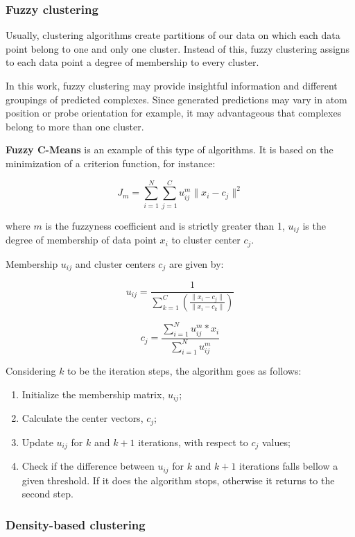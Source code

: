 \subsubsection{Fuzzy clustering}
Usually, clustering algorithms create partitions of our data on which each data point belong to one and only one cluster. Instead of this, fuzzy clustering \cite{jain1999data} assigns to each data point a degree of membership to every cluster.

In this work, fuzzy clustering may provide insightful information and different groupings of predicted complexes. Since generated predictions may vary in atom position or probe orientation for example, it may advantageous that complexes belong to more than one cluster.

\textbf{Fuzzy C-Means} is an example of this type of algorithms. It is based on the minimization of a criterion function, for instance:

$$J_m = \sum_{i=1}^{N}\sum_{j=1}^{C} u_{ij}^m \parallel x_i - c_j \parallel^2 $$

where $m$ is the fuzzyness coefficient and is strictly greater than 1, $u_{ij}$ is the degree of membership of data point $x_i$ to cluster center $c_j$.

Membership $u_{ij}$ and cluster centers $c_j$ are given by:

$$u_{ij} = \frac{1}{\sum_{k=1}^{C} \left( \frac{\parallel x_i - c_j \parallel}{\parallel x_i - c_k \parallel} \right) }$$


$$c_j = \frac{\sum_{i=1}^{N} u_{ij}^m * x_i}{\sum_{i=1}^{N}u_{ij}^m}$$

Considering $k$ to be the iteration steps, the algorithm goes as follows:
\begin{enumerate}
	\item Initialize the membership matrix, $u_{ij}$;
	\item Calculate the center vectors, $c_j$;  
	\item Update $u_{ij}$ for $k$ and $k+1$ iterations, with respect to $c_j$ values;
	\item Check if the difference between $u_{ij}$ for $k$ and $k+1$ iterations falls bellow a given threshold. If it does the algorithm stops, otherwise it returns to the second step. 
\end{enumerate}

\subsubsection{Density-based clustering}

